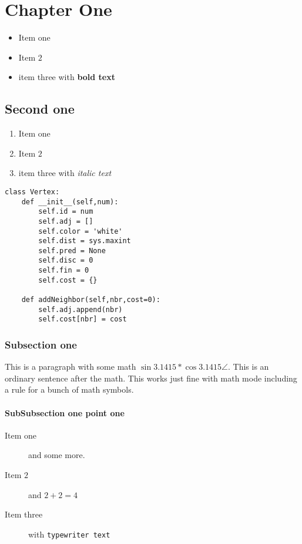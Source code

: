 \documentclass[letter]{article}
\begin{document}
\maketitle
\chapter{Chapter One}



\begin{itemize}
    \item Item one
    \item Item $2$
    \item item three with \textbf{bold text}
\end{itemize}

\section{Second one}
\begin{enumerate}
    \item Item one
    \item Item $2$
    \item item three with \textit{italic text}
\end{enumerate}

\begin{lstlisting}[caption=The Vertex Class,label=lst:vertex,float=htbp]
class Vertex:
    def __init__(self,num):
        self.id = num
        self.adj = []
        self.color = 'white'
        self.dist = sys.maxint
        self.pred = None
        self.disc = 0
        self.fin = 0
        self.cost = {}

    def addNeighbor(self,nbr,cost=0):
        self.adj.append(nbr)
        self.cost[nbr] = cost
\end{lstlisting}

\subsection{Subsection one}
This is a paragraph with some math $ \sin{3.1415} * \cos{3.1415} \angle  $.  This is an ordinary sentence after the math.  This works just fine with math mode including a rule for a bunch of math symbols.

\subsubsection{SubSubsection one point one}
\begin{description}
    \item[Item one]  and some more.
    \item[Item $2$] and $2+2 = 4$
    \item[Item three] with \texttt{typewriter text}
\end{description}
\end{document}
